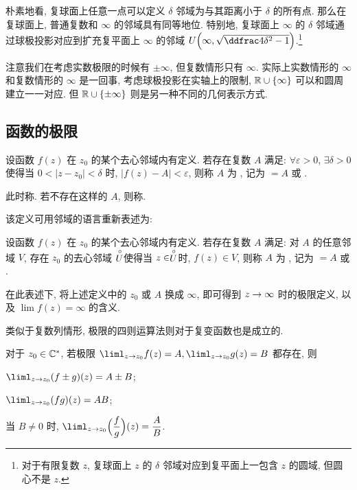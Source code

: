 朴素地看, 复球面上任意一点可以定义 $\delta$ 邻域为与其距离小于 $\delta$ 的所有点.
那么在复球面上, 普通复数和 $\infty$ 的邻域具有同等地位.
特别地, 复球面上 $\infty$ 的 $\delta$ 邻域通过球极投影对应到扩充复平面上 $\infty$ 的邻域
$U\Bigl(\infty, \sqrt{\ddfrac4{\delta^2}-1}\Bigr)$.\footnote{
  对于有限复数 $z$, 复球面上 $z$ 的 $\delta$ 邻域对应到复平面上一包含 $z$ 的圆域, 但圆心不是 $z$.
}

注意我们在考虑实数极限的时候有 $\pm\infty$, 但复数情形只有 $\infty$.
实际上实数情形的 $\infty$ 和复数情形的 $\infty$ 是一回事, 考虑球极投影在实轴上的限制, ${\mathbb{R}}\cup\{\infty\}$ 可以和圆周建立一一对应.
但 ${\mathbb{R}}\cup\{\pm\infty\}$ 则是另一种不同的几何表示方式.


\subsection{函数的极限}

\begin{definition}
  设函数 $f(z)$ 在 $z_0$ 的某个去心邻域内有定义.
  若存在复数 $A$ 满足: $\forall\varepsilon>0$, $\exists \delta>0$ 使得当 $0<|z-z_0|<\delta$ 时, $|f(z)-A|<\varepsilon$, 则称 $A$ 为 , 记为 $=A$ 或 .
\end{definition}

此时称.
若不存在这样的 $A$, 则称.

该定义可用邻域的语言重新表述为:
\begin{definition}
  设函数 $f(z)$ 在 $z_0$ 的某个去心邻域内有定义.
  若存在复数 $A$ 满足: 对 $A$ 的任意邻域 $V$, 存在 $z_0$ 的去心邻域 $\stackrel{\circ}{U}\!\!$ 使得当 $z\in\stackrel{\circ}{U}\!\!$ 时, $f(z)\in V$, 则称 $A$ 为 , 记为 $=A$ 或 .
\end{definition}

在此表述下, 将上述定义中的 $z_0$ 或 $A$ 换成 $\infty$, 即可得到 $z\rightarrow\infty$ 时的极限定义, 以及 $\lim f(z)=\infty$ 的含义.

类似于复数列情形, 极限的四则运算法则对于复变函数也是成立的.
\begin{theorem}
  \label{thm:limfunctionfour}
  对于 $z_0\in{\mathbb{C}}^*$, 若极限 $\liml_{z\ra z_0}f(z)=A,\liml_{z\ra z_0}g(z)=B$ 都存在, 则
  \begin{enuma}
    \item $\liml_{z\ra z_0}(f\pm g)(z)=A\pm B$;
    \item $\liml_{z\ra z_0}(fg)(z)=AB$;
    \item 当 $B\neq 0$ 时, $\liml_{z\ra z_0}\Bigl(\dfrac fg\Bigr)(z)=\dfrac AB$.
  \end{enuma}
\end{theorem}

